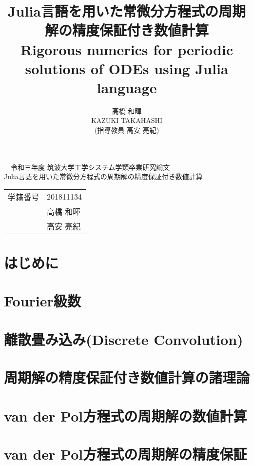 \documentclass[twoside,twocolumn,a4j,dvipdfmx]{jarticle}
\title{{\Large Julia言語を用いた常微分方程式の周期解の精度保証付き数値計算} \\ {\large Rigorous numerics for periodic solutions of ODEs using Julia language}}
\author{{\Large 高橋 和暉 } \\ KAZUKI TAKAHASHI \\ (指導教員  高安 亮紀)}
\begin{document}
\begin{titlepage}
\begin{center}
\vspace*{10mm}
{\large　令和三年度 筑波大学工学システム学類卒業研究論文} \\
\vspace*{30mm}
{\Large Julia言語を用いた常微分方程式の周期解の精度保証付き数値計算} 
\vspace{100mm} \\
\begin{tabular}{rl}
{\Large 学籍番号} & {\Large 201811134} \\
\addlinespace[10mm]
{\Large 氏名} & {\Large 高橋 和暉} \\
\addlinespace[10mm]
{\Large 指導教員} & {\Large 高安 亮紀}
\end{tabular} 
\end{center}
\end{titlepage}

\clearpage

\maketitle
\thispagestyle{headings}

\section{はじめに}
\Introduction

\section{Fourier級数}
\Fourierseries

\section{離散畳み込み(Discrete Convolution)}
\Convolution

\section{周期解の精度保証付き数値計算の諸理論}
\Theories

\section{van der Pol方程式の周期解の数値計算}
\ODE

\section{van der Pol方程式の周期解の精度保証}
\VerifyPO
\end{document}
